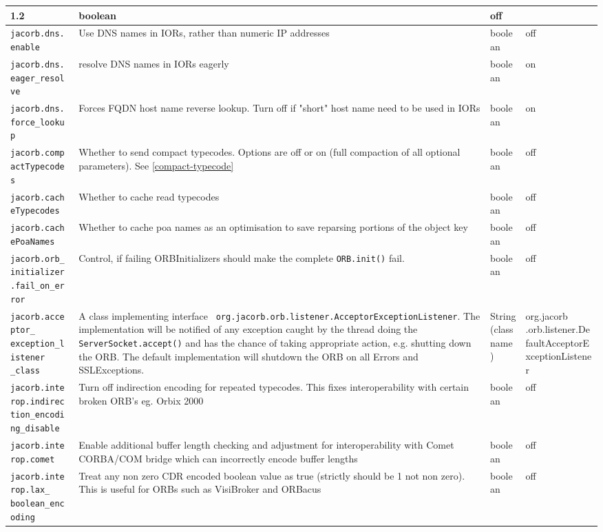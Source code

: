 \begin{small}
\begin{longtable}{|p{5cm}|p{7.5cm}|p{1.5cm}|p{1.5cm}|}
1.2 & boolean & off \\
\hline
\verb"jacorb.dns.enable" & Use DNS names in IORs, rather than numeric
IP addresses & boolean & off \\
\hline
\verb"jacorb.dns.eager_resolve" & resolve DNS names in IORs eagerly & boolean & on \\
\hline
\verb"jacorb.dns.force_lookup" & Forces FQDN host name reverse lookup.
Turn off if "short" host name need to be used in IORs & boolean & on \\
\hline
\verb"jacorb.compactTypecode"
\verb"s" & Whether to send compact typecodes. Options are off or on (full compaction of all optional parameters). See \ref{compact-typecode} & boolean & off \\
\hline
\verb"jacorb.cacheTypecodes" & Whether to cache read
typecodes  & boolean & off \\
\hline
\verb"jacorb.cachePoaNames" & Whether to cache poa names as an optimisation
to save reparsing portions of the object key& boolean & off \\
\hline
\verb"jacorb.orb_initializer"
\verb".fail_on_error" & Control, if failing ORBInitializers should make the
complete {\tt ORB.init()} fail. & boolean & off \\
\hline
\verb"jacorb.acceptor_"
\verb"exception_listener"
\verb"_class" & A class implementing interface {\tt
  org.jacorb.orb.listener.AcceptorException\-Listener}. The implementation
will be notified of any exception caught by the thread doing the {\tt
  ServerSocket.accept()} and has the chance of taking appropriate action,
e.g. shutting down the ORB. The default implementation will shutdown the ORB
on all Errors and SSLExceptions. & String (classname) & org.jacorb
.orb.listener.DefaultAcceptorExceptionListener \\
\hline
\verb"jacorb.interop.indirec"
\verb"tion_encoding_disable" & Turn off indirection encoding for
repeated typecodes. This fixes interoperability with certain broken
ORB's eg. Orbix 2000 & boolean & off \\
\hline
\verb"jacorb.interop.comet" & Enable additional buffer length checking
and adjustment for interoperability with Comet CORBA/COM bridge which
can incorrectly encode buffer lengths & boolean & off \\
\hline
\verb"jacorb.interop.lax_"
\verb"boolean_encoding" & Treat any non zero CDR encoded boolean value
as true (strictly should be 1 not non zero). This is useful for ORBs such
as VisiBroker and ORBacus & boolean & off \\

\end{longtable}
\end{small}

